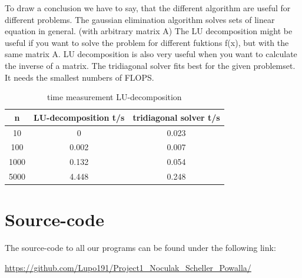 \documentclass[10pt,a4paper]{article}
\begin{document}
To draw a conclusion we have to say, that the different algorithm are useful for different problems. The gaussian elimination algorithm solves sets of linear equation in general. (with arbitrary matrix A) 
The LU decomposition might be useful if you want to solve the problem for different fuktions f(x), but with the same matrix A. LU decomposition is also very useful when you want to calculate the inverse of a matrix. The tridiagonal solver fits best for the given problemset. It needs the smallest numbers of FLOPS. 

\begin{table}
\centering
\caption{time measurement LU-decomposition}
\label{LU tridiagonal time}
\begin{tabular}{c|c|c}
n & LU-decomposition t/s & tridiagonal solver t/s \\
\hline\hline
10  &0 & 0.023\\
100  &0.002 & 0.007\\
1000 & 0.132 & 0.054\\
5000 & 4.448 & 0.248\\
\end{tabular}
\end{table}


\section{Source-code}

The source-code to all our programs can be found under the following link:

\url{https://github.com/Lupo191/Project1_Noculak_Scheller_Powalla/}
\end{document}
